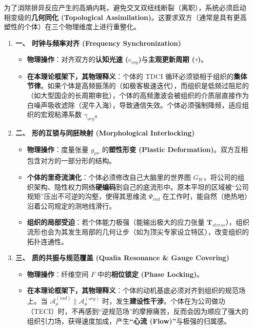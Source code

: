 为了消除排异反应产生的高熵内耗，避免交叉双纽线断裂（离职），系统必须启动相变级的\textbf{几何同化 (Topological Assimilation)}。这要求双方（通常是具有更高塑性的个体）在三个物理维度上进行重整化。

\begin{enumerate}
    \item \textbf{\textcolor{structurecolor}{一、 时钟与频率对齐 (Frequency Synchronization)}}
    \begin{itemize}
        \item \textbf{物理操作}：对齐双方的\textbf{认知光速 ($c_{cog}$)}与\textbf{主观更新周期 ($\tau$)}。
        \item \textbf{在本理论框架下，其物理释义}：个体的 TDCI 循环必须锁相于组织的\textbf{集体节律}。如果个体是高频振荡的（如极客极速迭代），而组织是低频过阻尼的（如大型国企的长周期审批），个体的高频激波会被组织的介质层直接作为白噪声吸收滤除（泥牛入海），导致通信失效。个体必须强制降频，适应组织的宏观粘滞系数 $\gamma_{org}$。
    \end{itemize}

    \item \textbf{\textcolor{structurecolor}{二、 形的互锁与同胚映射 (Morphological Interlocking)}}
    \begin{itemize}
        \item \textbf{物理操作}：度量张量 $g_{\mu\nu}$ 的\textbf{塑性形变 (Plastic Deformation)}。双方互相包含对方的一部分形的结构。
        \item \textbf{个体的里奇流演化}：个体必须修改自己大脑里的世界图 $G_W$，将公司的组织架构、隐性权力网络\textbf{硬编码}到自己的底流形中。原本平坦的区域被“公司规矩”压出不可逆的沟壑，使得其思维流 $\Psi_{ind}$ 在工作时，能自然（绝热地）沿着公司规定的测地线滑行。
        \item \textbf{组织的局部受迫}：若个体能力极强（能输出极大的应力张量 $\mathbf{T}_{stress}$），组织流形也会为其发生局部的几何让步（如为顶尖专家设立特区），改变组织的拓扑连通性。
    \end{itemize}

    \item \textbf{\textcolor{structurecolor}{三、 质的共振与规范覆盖 (Qualia Resonance \& Gauge Covering)}}
    \begin{itemize}
        \item \textbf{物理操作}：纤维空间 $F$ 中的\textbf{相位锁定 (Phase Locking)}。
        \item \textbf{在本理论框架下，其物理释义}：个体的动机基底必须对齐到组织的规范场上。当 $\mathcal{A}_\mu^{(ind)} \parallel \mathcal{A}_\mu^{(org)}$ 时，发生\textbf{建设性干涉}。个体在为公司做功（TECI）时，不再感到“逆规范场”的摩擦痛苦，反而会因为顺应了强大的组织引力场，获得速度加成，产生\textbf{“心流 (Flow)”}与极强的归属感。
    \end{itemize}
\end{enumerate}

